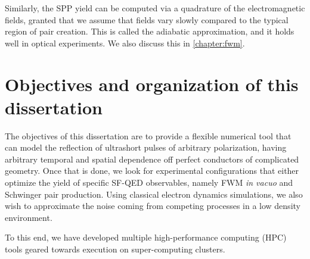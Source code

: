 \documentclass[11pt,SymmetricalJury]{inrsthesis/inrsthesis}
\begin{document}
Similarly, the SPP yield can be computed via a quadrature of the
electromagnetic fields, granted that we assume that fields vary slowly compared
to the typical region of pair creation. This is called the adiabatic approximation,
and it holds well in optical experiments. We also discuss this in \ref{chapter:fwm}.

\section{Objectives and organization of this dissertation}
\label{sec:intro.objectives}

The objectives of this dissertation are to provide a flexible numerical tool that
can model the reflection of ultrashort pulses of arbitrary polarization, having
arbitrary temporal and spatial dependence off perfect conductors of complicated
geometry. Once that is done, we look for experimental configurations that either
optimize the yield of specific SF-QED observables, namely FWM \textit{in vacuo}
and Schwinger pair production. Using classical electron dynamics simulations, we
also wish to approximate the noise coming from competing processes in a low
density environment.

To this end, we have developed multiple high-performance computing (HPC) tools
geared towards execution on super-computing clusters.
\end{document}
